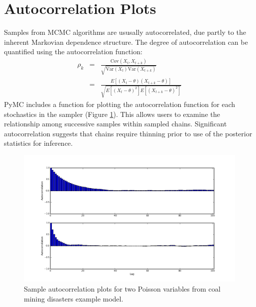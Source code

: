 
\hypertarget{autocorrelation}{}
\section{Autocorrelation Plots} %

Samples from MCMC algorithms are ususally autocorrelated, due partly to the
inherent Markovian dependence structure. The degree of autocorrelation can
be quantified using the autocorrelation function:
\begin{eqnarray*}
    \rho_k &=& \frac{\mbox{Cov}(X_t,
X_{t+k})}{\sqrt{\mbox{Var}(X_t)\mbox{Var}(X_{t+k})}} \\
            &=& \frac{E[(X_t - \theta)(X_{t+k} - \theta)]}{\sqrt{E[(X_t -
\theta)^2] E[(X_{t+k} - \theta)^2]}}
\end{eqnarray*}
PyMC includes a function for plotting the autocorrelation function for each
stochastics in the sampler (Figure \ref{fig:autocorr}). This allows users
to examine the relationship among successive samples within sampled chains.
Significant autocorrelation suggests that chains require thinning prior to
use of the posterior statistics for inference.

\begin{figure}[h]
        \begin{center}
        \includegraphics[scale=0.4]{autocorr.png}
    \end{center}
    \caption{Sample autocorrelation plots for two Poisson variables from
coal mining disasters example model.}
    \label{fig:autocorr}
\end{figure}

